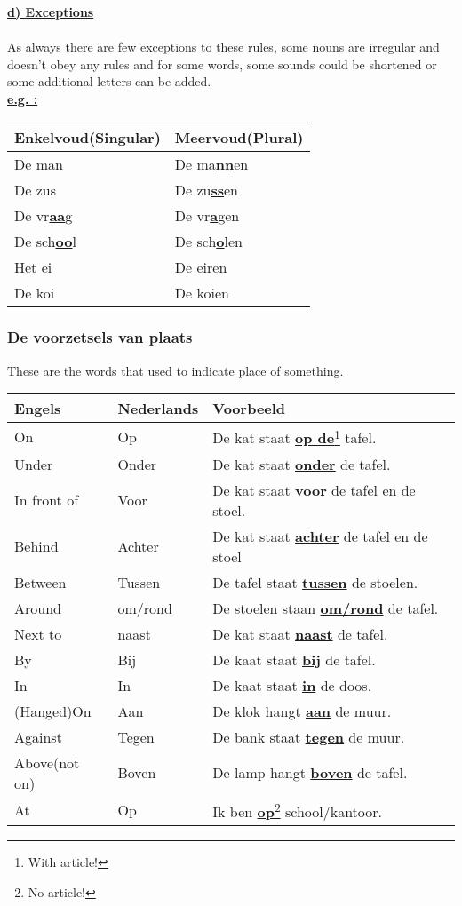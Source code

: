 \documentclass[a4paper,14pt]{extarticle}
\newcommand{\note}[2]{\underline{\textbf{#1}}\footnote{#2}}
\newcommand{\emp}[1]{\underline{\textbf{#1}}}
\begin{document}
\emp{d) Exceptions} \\ \\
As always there are few exceptions to these rules, some nouns are irregular and doesn't obey any rules and for some words, some sounds could be shortened or some additional letters can be added. \\
\emp{e.g. : } \\
\begin{tabularx}{\textwidth}{ p{} p{} }
 \hline
 Enkelvoud(Singular) & Meervoud(Plural)\\
 \hline
 De man & De ma\emp{nn}en \\
 De zus & De zu\emp{ss}en \\
 De vr\emp{aa}g & De vr\emp{a}gen \\
 De sch\emp{oo}l & De sch\emp{o}len \\
 Het ei & De eiren \\
 De koi & De koien \\
\end{tabularx}
\subsubsection{De voorzetsels van plaats}
These are the words that used to indicate place of something. \\
\begin{tabularx}{\textwidth}{ p{} p{} p{} }
 \hline
 Engels & Nederlands & Voorbeeld\\
 \hline
 On & Op & De kat staat \note{op de}{With article!} tafel. \\
 Under & Onder & De kat staat \emp{onder} de tafel.\\
 In front of & Voor & De kat staat \emp{voor} de tafel en de stoel.\\
 Behind & Achter & De kat staat \emp{achter} de tafel en de stoel\\
 Between & Tussen & De tafel staat \emp{tussen} de stoelen.\\
 Around & om/rond & De stoelen staan \emp{om/rond} de tafel.\\
 Next to & naast & De kat staat \emp{naast} de tafel.\\
 By & Bij & De kaat staat \emp{bij} de tafel.\\
 In & In & De kaat staat \emp{in} de doos.\\
 (Hanged)On & Aan & De klok hangt \emp{aan} de muur.\\
 Against & Tegen & De bank staat \emp{tegen} de muur.\\
 Above(not on) & Boven & De lamp hangt \emp{boven} de tafel.\\
 At & Op & Ik ben \note{op}{No article!} school/kantoor.
\end{tabularx}
\newpage
\end{document}
